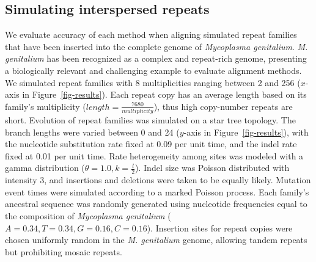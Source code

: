 \documentclass{llncs}
\begin{document}
\subsection{Simulating interspersed repeats}
We evaluate accuracy of each method when aligning simulated repeat
families that have been inserted into the complete genome of
\emph{Mycoplasma genitalium}. \emph{M. genitalium} has been recognized
as a complex and repeat-rich genome, presenting a biologically
relevant and challenging example to evaluate alignment
methods\cite{ref-mycoplasma}. We simulated repeat families with 8
multiplicities ranging between 2 and 256 ($x$-axis in
Figure~\ref{fig-results}).  Each repeat copy has an average length
based on its family's multiplicity
($length=\frac{7680}{multiplicity}$), thus high copy-number repeats
are short.  Evolution of repeat families was simulated on a star tree
topology.  The branch lengths were varied between 0 and 24 ($y$-axis
in Figure~\ref{fig-results}), with the nucleotide substitution rate
fixed at 0.09 per unit time, and the indel rate fixed at 0.01 per
unit time.  Rate heterogeneity among sites was modeled with a gamma
distribution ($\theta = 1.0, k = \frac{l}{2}$).  Indel size was
Poisson distributed with intensity 3, and insertions and deletions
were taken to be equally likely.  Mutation event times were simulated
according to a marked Poisson process.  Each family's ancestral
sequence was randomly generated using nucleotide frequencies equal to
the composition of \emph{Mycoplasma genitalium}
($A=0.34,T=0.34,G=0.16,C=0.16$). Insertion sites for repeat copies
were chosen uniformly random in the \textit{M. genitalium} genome,
allowing tandem repeats but prohibiting mosaic repeats.
\end{document}
